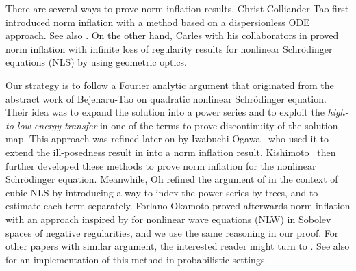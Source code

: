 \documentclass[letterpaper, 11pt,  reqno]{amsart}
\newcommand{\1}{\hspace{0.5mm}\text{I}\hspace{0.5mm}}
\newcommand{\s}{\sigma}
\numberwithin{equation}{section}
\numberwithin{theorem}{section}
\begin{document}
There are several ways to prove norm inflation results. Christ-Colliander-Tao \cite{CCT} first introduced norm inflation with a method based on a dispersionless ODE approach. See also \cite{BTz1, Xia}. On the other hand, Carles with his collaborators in \cite{AC, BC, CK} proved norm inflation with infinite loss of regularity results for nonlinear Schr\"odinger equations (NLS) by using geometric optics.




Our strategy is to follow a Fourier analytic argument that originated from the abstract work of Bejenaru-Tao \cite{BT} on quadratic nonlinear Schr\"odinger equation. Their idea was to expand the solution into a power series and to exploit the {\it high-to-low energy transfer} in one of the terms to prove discontinuity of the solution map. This approach was refined later on by  Iwabuchi-Ogawa~\cite{IO} who used it to extend the ill-posedness result in \cite{BT} into a norm inflation result. Kishimoto~\cite{Kis} then further developed these methods to prove norm inflation for the nonlinear Schr\"odinger equation. Meanwhile, Oh \cite{Oh} refined the argument of \cite{IO} in the context of cubic NLS by introducing a way to index the power series by trees, and to estimate each term separately. Forlano-Okamoto \cite{FO} proved afterwards norm inflation with an approach inspired by \cite{Oh} for nonlinear wave equations (NLW) in Sobolev spaces of negative regularities, and we use the same reasoning in our proof. For other papers with similar argument, the interested reader might turn to \cite{BH2, COW, CP, OOT, Ok, WZ}. See also \cite{Chevyrev} for an implementation of this method in probabilistic settings.

\end{document}
